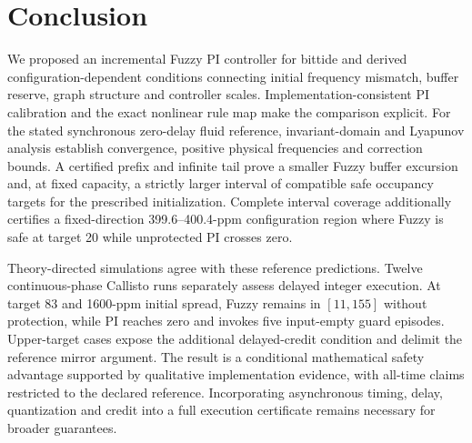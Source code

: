 \section{Conclusion}
\label{sec:conclusion}

We proposed an incremental Fuzzy PI controller for bittide and
derived configuration-dependent conditions connecting initial
frequency mismatch, buffer reserve, graph structure and controller
scales. Implementation-consistent PI calibration and the exact
nonlinear rule map make the comparison explicit. For the stated
synchronous zero-delay fluid reference, invariant-domain and
Lyapunov analysis establish convergence, positive physical
frequencies and correction bounds. A certified prefix and infinite
tail prove a smaller Fuzzy buffer excursion and, at fixed capacity,
a strictly larger interval of compatible safe occupancy targets for
the prescribed initialization. Complete interval coverage additionally
certifies a fixed-direction 399.6--400.4-ppm configuration region
where Fuzzy is safe at target 20 while unprotected PI crosses zero.

Theory-directed simulations agree with these reference predictions.
Twelve continuous-phase Callisto runs separately assess delayed
integer execution. At target 83 and 1600-ppm initial spread, Fuzzy
remains in $[11,155]$ without protection, while PI reaches zero and
invokes five input-empty guard episodes. Upper-target cases expose
the additional delayed-credit condition and delimit the reference
mirror argument. The result is a conditional mathematical safety
advantage supported by qualitative implementation evidence, with
all-time claims restricted to the declared reference. Incorporating
asynchronous timing, delay, quantization and credit into a full
execution certificate remains necessary for broader guarantees.
